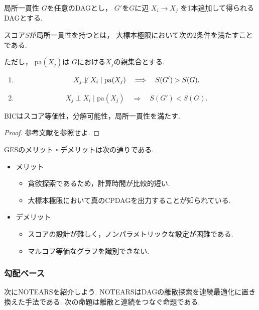\documentclass[uplatex, dvipdfmx]{jsarticle}
\begin{document}
\begin{defn}{局所一貫性}
  $G$を任意のDAGとし，
  $G'$を$G$に辺
  $X_i\rightarrow X_j$
  を1本追加して得られるDAGとする.

  スコア$S$が局所一貫性を持つとは，
  大標本極限において次の2条件を満たすことである.

  ただし，
  $\mathrm{pa}(X_j)$は
  $G$における$X_j$の親集合とする.

  \begin{enumerate}
    \item
    \[
      X_j\not\!\perp X_i
      \mid
      \mathrm{pa}(X_j)
      \quad\Longrightarrow\quad
      S(G')>S(G).
    \]

    \item
    \[
      X_j\perp X_i
      \mid
      \mathrm{pa}(X_j)
      \quad\Longrightarrow\quad
      S(G')<S(G).
    \]
  \end{enumerate}
\end{defn}

\begin{thm}{}
  BICはスコア等価性，分解可能性，局所一貫性を満たす.
\end{thm}
\begin{proof}
  参考文献\cite{chickering2002}を参照せよ.
\end{proof}    


GESのメリット・デメリットは次の通りである.
\begin{itemize}
  \item メリット
    \begin{itemize}
      \item 貪欲探索であるため，計算時間が比較的短い.
      \item 大標本極限において真のCPDAGを出力することが知られている.
    \end{itemize}

  \item デメリット
    \begin{itemize}
      \item スコアの設計が難しく，ノンパラメトリックな設定が困難である.
      \item マルコフ等価なグラフを識別できない.
    \end{itemize}
  \end{itemize}

\subsubsection*{勾配ベース}
次にNOTEARSを紹介しよう.
NOTEARSはDAGの離散探索を連続最適化に置き換えた手法である.
次の命題は離散と連続をつなぐ命題である.
\end{document}
